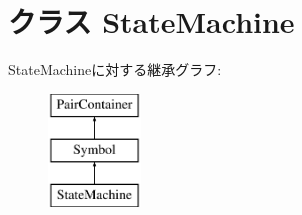\hypertarget{classslicc_1_1symbols_1_1StateMachine_1_1StateMachine}{
\section{クラス StateMachine}
\label{classslicc_1_1symbols_1_1StateMachine_1_1StateMachine}
}
StateMachineに対する継承グラフ:\begin{figure}[H]
\begin{center}
\leavevmode
\includegraphics[height=3cm]{classslicc_1_1symbols_1_1StateMachine_1_1StateMachine}
\end{center}
\end{figure}
